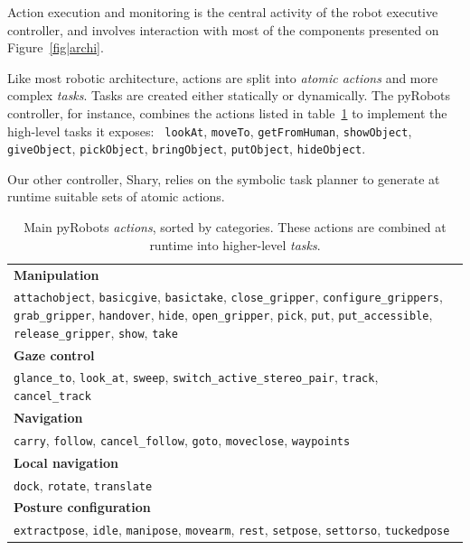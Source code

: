 \documentclass[preprint,3p,times]{elsarticle}
\begin{document}
Action execution and monitoring is the central activity of the robot executive
controller, and involves interaction with most of the components presented on
Figure~\ref{fig|archi}.

Like most robotic architecture, actions are split into \emph{atomic actions}
and more complex \emph{tasks}. Tasks are created either statically or dynamically.
The {\sc pyRobots} controller, for instance, combines the actions listed in
table~\ref{table|pyrobots_actions} to implement the high-level tasks it exposes: {\tt
lookAt}, {\tt moveTo}, {\tt getFromHuman}, {\tt showObject}, {\tt giveObject},
{\tt pickObject}, {\tt bringObject}, {\tt putObject}, {\tt hideObject}.

Our other controller, {\sc Shary}, relies on the symbolic task planner to
generate at runtime suitable sets of atomic actions.

\begin{table}
\begin{center}
\begin{tabular}{p{8cm}}
\hline
    {\bf Manipulation} \\
     {\tt attachobject}, {\tt basicgive}, {\tt basictake}, {\tt close\_gripper}, {\tt configure\_grippers}, {\tt grab\_gripper}, {\tt handover}, {\tt hide}, {\tt open\_gripper}, {\tt pick}, {\tt put}, {\tt put\_accessible}, {\tt release\_gripper}, {\tt show}, {\tt take} \\
\hline
    {\bf Gaze control} \\
     {\tt glance\_to}, {\tt look\_at}, {\tt sweep}, {\tt switch\_active\_stereo\_pair}, {\tt track}, {\tt cancel\_track} \\
\hline
    {\bf Navigation} \\
     {\tt carry}, {\tt follow}, {\tt cancel\_follow}, {\tt goto}, {\tt moveclose}, {\tt waypoints} \\
\hline
    {\bf Local navigation} \\
     {\tt dock}, {\tt rotate}, {\tt translate} \\
\hline
    {\bf Posture configuration} \\
     {\tt extractpose}, {\tt idle}, {\tt manipose}, {\tt movearm}, {\tt rest}, {\tt setpose}, {\tt settorso}, {\tt tuckedpose} \\
\hline
\end{tabular}
\end{center}
\caption{Main {\sc pyRobots} \emph{actions}, sorted by categories. These
actions are combined at runtime into higher-level \emph{tasks}.}

\label{table|pyrobots_actions}
\end{table}
\end{document}
